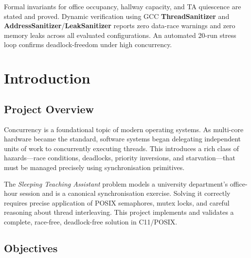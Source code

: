 \documentclass[12pt,a4paper]{report}
\begin{document}
Formal invariants for office occupancy, hallway capacity, and TA quiescence are stated and
proved. Dynamic verification using GCC \textbf{ThreadSanitizer} and
\textbf{AddressSanitizer}/\textbf{LeakSanitizer} reports zero data-race warnings and zero
memory leaks across all evaluated configurations. An automated 20-run stress loop confirms
deadlock-freedom under high concurrency.

\clearpage

\tableofcontents
\clearpage


\chapter{Introduction}

\section{Project Overview}

Concurrency is a foundational topic of modern operating systems. As multi-core hardware became
the standard, software systems began delegating independent units of work to concurrently
executing threads. This introduces a rich class of hazards---race conditions, deadlocks,
priority inversions, and starvation---that must be managed precisely using synchronisation
primitives.

The \textit{Sleeping Teaching Assistant} problem models a university department's office-hour
session and is a canonical synchronisation exercise. Solving it correctly requires precise
application of POSIX semaphores, mutex locks, and careful reasoning about thread interleaving.
This project implements and validates a complete, race-free, deadlock-free solution in
C11/POSIX.

\section{Objectives}
\end{document}
